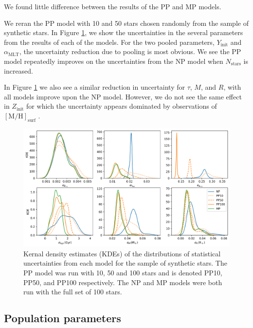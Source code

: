 \documentclass[a4paper,fleqn,usenatbib]{mnras}
\newcommand{\metallicity}{\ensuremath{[\mathrm{M}/\mathrm{H}]}}
\newcommand{\mlt}{\ensuremath{{\alpha_\mathrm{MLT}}}}
\begin{document}
We found little difference between the results of the PP and MP models.

We reran the PP model with 10 and 50 stars chosen randomly from the sample of synthetic stars. In Figure \ref{fig:shrinkage}, we show the uncertainties in the several parameters from the results of each of the models. For the two pooled parameters, $Y_\mathrm{init}$ and $\mlt$, the uncertainty reduction due to pooling is most obvious. We see the PP model repeatedly improves on the uncertainties from the NP model when $N_\mathrm{stars}$ is increased. 

In Figure \ref{fig:shrinkage} we also see a similar reduction in uncertainty for $\tau$, $M$, and $R$, with all models improve upon the NP model. However, we do not see the same effect in $Z_\mathrm{init}$ for which the uncertainty appears dominated by observations of $\metallicity_\mathrm{surf}$ .

\begin{figure}
    \centering
    \includegraphics[width=\textwidth]{figures/shrinkage.png}
    \caption{Kernal density estimates (KDEs) of the distributions of statistical uncertainties from each model for the sample of synthetic stars. The PP model was run with 10, 50 and 100 stars and is denoted PP10, PP50, and PP100 respectively. The NP and MP models were both run with the full set of 100 stars.}
    \label{fig:shrinkage}
\end{figure}

\subsection{Population parameters}

\end{document}
